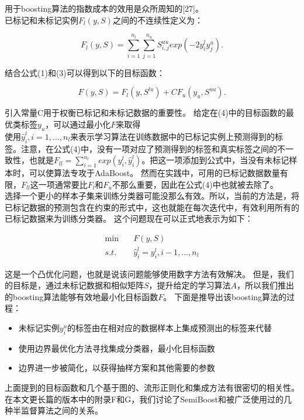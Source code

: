 \documentclass[10pt,journal,compsoc]{IEEEtran}
\begin{document}
用于boosting算法的指数成本的效用是众所周知的[27]。\\
已标记和未标记实例$F_l(y,S)$之间的不连续性定义为：
\begin{center}
\begin{equation}
F_l(y,S)=\sum^{n_l}_{i=1}\sum^{n_u}_{j=1}S^{uu}_{i,j}exp(-2y^l_iy^u_j).
\end{equation}
\end{center}
结合公式(1)和(3)可以得到以下的目标函数：
\begin{center}
\begin{equation}
F(y,S)=F_l(y,S^{lu})+CF_u(y_u,S^{uu}).
\end{equation}
\end{center}
引入常量C用于权衡已标记和未标记数据的重要性。
给定在(4)中的目标函数的最优类标签$y_u$，可以通过最小化$F$来取得\\
使用$\hat{y}_i^l,i=1,...,n_l$来表示学习算法在训练数据中的已标记实例上预测得到的标签。注意，在公式(4)中，没有一项对应了预测得到的标签和真实标签之间的不一致性，也就是$F_{ll}=\sum\nolimits^{n_l}_{i=1}exp(y_i^l,\hat{y}^l_i)$。把这一项添加到公式中，当没有未标记样本时，可以使算法专攻于AdaBoost。
然而在实践中，可用的已标记数据数量有限，$F_{ll}$这一项通常要比$F_l$和$F_u$不那么重要，因此在公式(4)中也就被去除了。\\
选择一个更小的样本子集来训练分类器可能没那么有效。所以，当前的方法是，将已标记数据的预测包含在约束的形式中，这也就能在每次迭代中，有效利用所有的已标记数据来为训练分类器。
这个问题现在可以正式地表示为如下：

\begin{center}
\begin{equation}
  \begin{split}
  \min \quad &F(y,S) \\
  s.t. \quad &\hat{y}^l_i=y^l_i,i-1,\ldots,n_l
  \end{split}
\end{equation}
\end{center}

这是一个凸优化问题，也就是说该问题能够使用数字方法有效解决。
但是，我们的目标是，通过未标记数据和相似矩阵$S$，提升给定的学习算法$A$，所以我们推出的boosting算法能够有效地最小化目标函数$F$。
下面是推导出该boosting算法的过程：
\begin{itemize}
\item 未标记实例$y_i^u$的标签由在相对应的数据样本上集成预测出的标签来代替
\item 使用边界最优化方法寻找集成分类器，最小化目标函数
\item 边界进一步被简化，以获得抽样方案和其他需要的参数
\end{itemize}
上面提到的目标函数和几个基于图的、流形正则化和集成方法有很密切的相关性。在本文更长篇的版本中的附录F和G，我们讨论了SemiBoost和被广泛使用过的几种半监督算法之间的关系。
\end{document}
